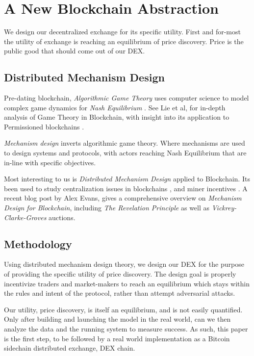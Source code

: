 \documentclass[12pt]{article}
\begin{document}
\section*{A New Blockchain Abstraction}
We design our decentralized exchange for its specific utility. First and for-most the utility of exchange is reaching an equilibrium of price discovery. Price is the public good that should come out of our DEX. 

\subsection*{Distributed Mechanism Design}
Pre-dating blockchain, \emph{Algorithmic Game Theory} uses computer science to model complex game  dynamics for \emph{Nash Equilibrium} \cite{nisan_roughgarden_tardos_vazirani_2007}. See Lie et al, for in-depth analysis of Game Theory in Blockchain, with insight into its application to Permissioned blockchains \cite{Liu}.  

\emph{Mechanism design} inverts algorithmic game theory. Where mechanisms are used to design systems and protocols, with actors reaching Nash Equilibrium that are in-line with specific objectives. \cite{nisan_2007} \cite{Shneidman} \cite{DBLP:journals/corr/abs-1905-08595}

Most interesting to us is \emph{Distributed Mechanism Design} applied to Blockchain. Its been used to study centralization issues in blockchains \cite{Ray}, and miner incentives \cite{Chen}.  A recent blog post by Alex Evans, gives a comprehensive overview on \emph{Mechanism Design for Blockchain}, including  \emph{The Revelation Principle} as well as \emph{Vickrey-Clarke-Groves} auctions. \cite{Evans}

\subsection {Methodology}
Using distributed mechanism design theory, we design our DEX for the purpose of providing the specific utility of price discovery. The design goal is properly incentivize traders and market-makers to reach an equilibrium which stays within the rules and intent of the protocol, rather than attempt adversarial attacks.

Our utility, price discovery, is itself an equilibrium, and is not easily quantified. Only after building and launching the model in the real world, can we then analyze the data and the running system to measure success. As such, this paper is the first step, to be followed by a real world implementation as a Bitcoin sidechain distributed exchange, DEX chain. 
\end{document}
